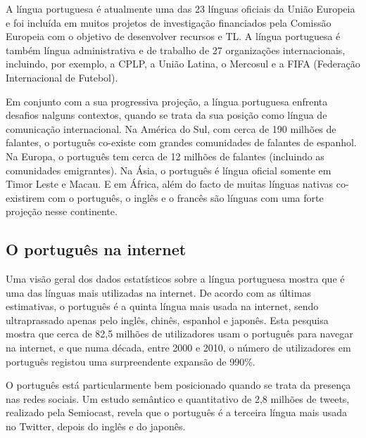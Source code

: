 \begin{multicols}{2}
A língua portuguesa é atualmente uma das 23 línguas oficiais da União Europeia e foi incluída em muitos projetos de investigação financiados pela Comissão Europeia com o objetivo de desenvolver recursos e TL. A língua portuguesa é também língua administrativa e de trabalho de 27 organizações internacionais, incluindo, por exemplo, a CPLP, a União Latina, o Mercosul e a FIFA (Federação Internacional de Futebol). 

Em conjunto com a sua progressiva projeção, a língua portuguesa enfrenta desafios nalguns contextos, quando se trata da sua posição como língua de comunicação internacional. Na América do Sul, com cerca de 190 milhões de falantes, o português co-existe com grandes comunidades de falantes de espanhol. Na Europa, o português tem cerca de 12 milhões de falantes (incluindo as comunidades e\-mi\-gran\-tes). Na Ásia, o português é língua oficial somente em Timor Leste e Macau. E em África, além do facto de muitas línguas nativas co-existirem com o português, o inglês e o francês são línguas com uma forte projeção nesse continente. 


\subsection{O português na internet}

 Uma visão geral dos dados estatísticos sobre a língua portuguesa mostra que é uma das línguas mais utilizadas na internet. De acordo com as últimas estimativas, o português é a quinta língua mais usada na internet, sendo ultraprassado apenas pelo inglês, chinês, espanhol e japonês\cite{stat7}. Esta pesquisa mostra que cerca de 82,5 milhões de utilizadores usam o português para navegar na internet, e que numa década, entre 2000 e 2010, o número de utilizadores em português registou uma surpreendente expansão de 990\%.

O português está particularmente bem posicionado quando se trata da presença nas redes sociais. Um estudo semântico e quantitativo de 2,8 milhões de tweets, realizado pela Semiocast, revela que o português é a terceira língua mais usada no Twitter, depois do inglês e do japonês\cite{twtrcon}.


\end{multicols}
